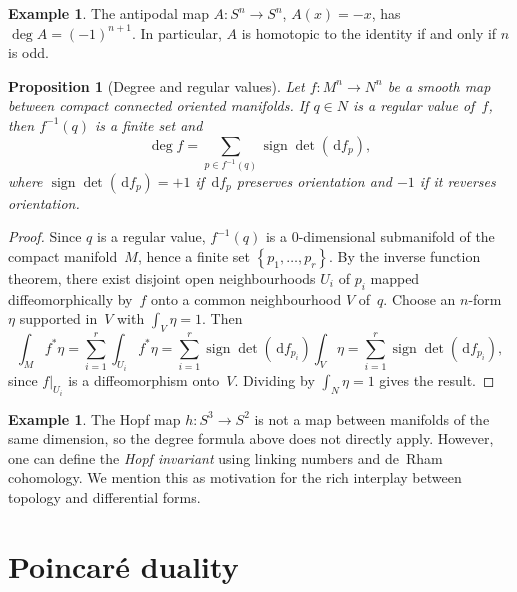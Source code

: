 \documentclass[12pt,a4paper,openany]{book}
\newtheorem{proposition}[theorem]{Proposition}
\theoremstyle{definition}
\newtheorem{example}[theorem]{Example}
\theoremstyle{remark}
\newcommand{\dd}{\,\mathrm{d}}
\newcommand{\set}[1]{\left\{ #1 \right\}}
\begin{document}
\begin{example}\label{ex:degree-antipodal}
The antipodal map $A\colon S^n\to S^n$, $A(x) = -x$, has
$\deg A = (-1)^{n+1}$.  In particular, $A$ is homotopic to the identity
if and only if $n$ is odd.
\end{example}

\begin{proposition}[Degree and regular values]\label{prop:degree-regular}
Let $f\colon M^n\to N^n$ be a smooth map between compact connected
oriented manifolds.  If $q\in N$ is a regular value of~$f$, then
$f^{-1}(q)$ is a finite set and
\[
  \deg f = \sum_{p\in f^{-1}(q)} \operatorname{sign}\det(\dd f_p),
\]
where $\operatorname{sign}\det(\dd f_p) = +1$ if $\dd f_p$ preserves
orientation and $-1$ if it reverses orientation.
\end{proposition}

\begin{proof}
Since $q$ is a regular value, $f^{-1}(q)$ is a $0$-dimensional
submanifold of the compact manifold~$M$, hence a finite set
$\set{p_1,\dots,p_r}$.  By the inverse function theorem, there exist
disjoint open neighbourhoods $U_i$ of $p_i$ mapped diffeomorphically
by~$f$ onto a common neighbourhood $V$ of~$q$.  Choose an $n$-form
$\eta$ supported in~$V$ with $\int_V\eta = 1$.  Then
\[
  \int_M f^*\eta = \sum_{i=1}^r \int_{U_i} f^*\eta
  = \sum_{i=1}^r \operatorname{sign}\det(\dd f_{p_i})
  \int_V\eta
  = \sum_{i=1}^r\operatorname{sign}\det(\dd f_{p_i}),
\]
since $f|_{U_i}$ is a diffeomorphism onto~$V$.  Dividing by
$\int_N\eta = 1$ gives the result.
\end{proof}

\begin{example}\label{ex:degree-hopf}
The Hopf map $h\colon S^3\to S^2$ is not a map between manifolds
of the same dimension, so the degree formula above does not directly
apply.  However, one can define the \emph{Hopf invariant} using
linking numbers and de~Rham cohomology.  We mention this as motivation
for the rich interplay between topology and differential forms.
\end{example}

\section{Poincar\'e duality}\label{sec:poincare-duality}
\end{document}
